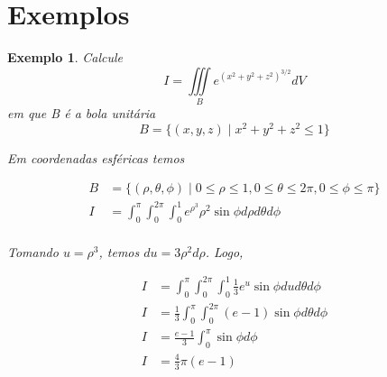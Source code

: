 \documentclass{article}
\newcommand{\tripleint}[2] {\iiint\limits_{#1} #2}
\newtheorem{example}{Exemplo}[section]
\begin{document}
    \section{Exemplos}
        \begin{example}
            Calcule
            \[
                I = \tripleint{B} e^{(x^2 + y^2 + z^2)^{3/2}} dV
            \]
            em que B é a bola unitária
            \[
                B = \{ (x,y,z) \mid x^2 + y^2 + z^2 \leq 1 \}
            \]

            Em coordenadas esféricas temos

            \begin{align*}
                B &= \{ (\rho, \theta, \phi) \mid 0 \leq \rho \leq 1, 0 \leq \theta \leq 2\pi, 0 \leq \phi \leq \pi \}\\
                I &= \int_0^\pi \int_0^{2\pi} \int_0^1 e^{\rho^3} \rho^2 \sin \phi d\rho d\theta d\phi\\
            \end{align*}

            Tomando $u = \rho^3$, temos $du = 3 \rho^2 d\rho$. Logo,

            \begin{align*}
                I &= \int_0^\pi \int_0^{2\pi} \int_0^1 \frac{1}{3} e^u \sin\phi du d\theta d\phi\\
                I &= \frac{1}{3} \int_0^\pi \int_0^{2\pi} (e - 1) \sin\phi d\theta d\phi\\
                I &= \frac{e - 1}{3} \int_0^\pi \sin\phi d\phi\\
                I &= \frac{4}{3} \pi (e - 1)\\
            \end{align*}
        \end{example}
\end{document}
